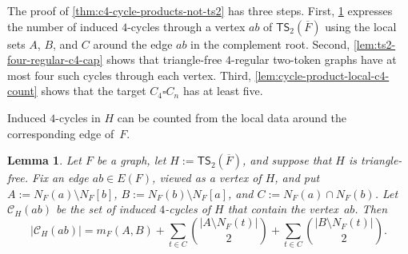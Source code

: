 \documentclass[a4paper]{article}
\theoremstyle{plain}
\newtheorem{lemma}[lemma]{Lemma}
\theoremstyle{definition}
\newcommand{\TSsym}{\mathsf{TS}}
\numberwithin{equation}{section}
\begin{document}
The proof of \cref{thm:c4-cycle-products-not-ts2} has three steps.
First, \cref{lem:ts2-local-c4-count} expresses the number of induced $4$-cycles through a vertex $ab$ of $\TSsym_2(\overline{F})$ using the local sets $A$, $B$, and $C$ around the edge $ab$ in the complement root.
Second, \cref{lem:ts2-four-regular-c4-cap} shows that triangle-free $4$-regular two-token graphs have at most four such cycles through each vertex.
Third, \cref{lem:cycle-product-local-c4-count} shows that the target $C_4\square C_n$ has at least five.

Induced $4$-cycles in $H$ can be counted from the local data around the corresponding edge of~$F$.

\begin{lemma}
\label{lem:ts2-local-c4-count}
Let $F$ be a graph, let $H:=\TSsym_2(\overline{F})$, and suppose that $H$ is triangle-free.
Fix an edge $ab\in E(F)$, viewed as a vertex of $H$, and put $A:=N_F(a)\setminus N_F[b]$, $B:=N_F(b)\setminus N_F[a]$, and $C:=N_F(a)\cap N_F(b)$.
Let $\mathcal C_H(ab)$ be the set of induced $4$-cycles of $H$ that contain the vertex~$ab$.
Then
\[
|\mathcal C_H(ab)|
=m_F(A,B)
+\sum_{t\in C}\binom{|A\setminus N_F(t)|}{2}
+\sum_{t\in C}\binom{|B\setminus N_F(t)|}{2}.
\]
\end{lemma}
\end{document}
